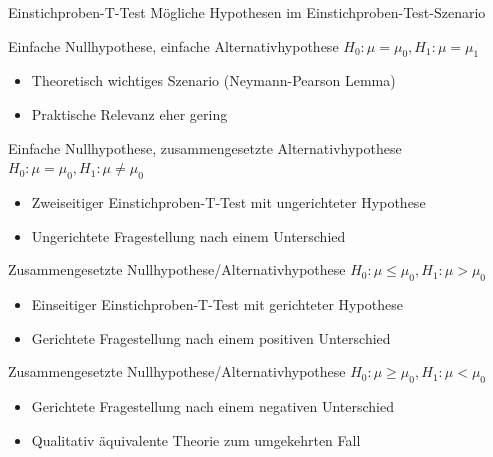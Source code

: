 \documentclass[
  8pt,
  ignorenonframetext,
]{beamer}
\begin{document}
\begin{frame}{Einstichproben-T-Test}
\protect\hypertarget{einstichproben-t-test-2}{}
Mögliche Hypothesen im Einstichproben-Test-Szenario \small
{}

Einfache Nullhypothese, einfache Alternativhypothese
\(H_0:\mu = \mu_0, H_1:\mu = \mu_1\)

\begin{itemize}
\item Theoretisch wichtiges Szenario (Neymann-Pearson Lemma)
\item Praktische Relevanz eher gering
\end{itemize}

Einfache Nullhypothese, zusammengesetzte Alternativhypothese
\(H_0:\mu = \mu_0, H_1:\mu \neq \mu_0\)

\begin{itemize}
\item Zweiseitiger Einstichproben-T-Test mit ungerichteter Hypothese
\item Ungerichtete Fragestellung nach einem Unterschied
\end{itemize}

Zusammengesetzte Nullhypothese/Alternativhypothese
\(H_0:\mu \le \mu_0, H_1:\mu > \mu_0\)

\begin{itemize}
\item Einseitiger Einstichproben-T-Test mit gerichteter Hypothese
\item Gerichtete Fragestellung nach einem positiven Unterschied
\end{itemize}

Zusammengesetzte Nullhypothese/Alternativhypothese
\(H_0:\mu\ge\mu_0,H_1:\mu<\mu_0\)

\begin{itemize}
\item Gerichtete Fragestellung nach einem negativen Unterschied
\item Qualitativ äquivalente Theorie zum umgekehrten Fall
\end{itemize}
\end{frame}
\end{document}
